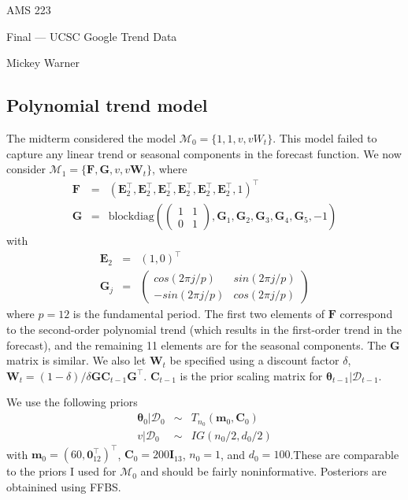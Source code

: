 \documentclass[12pt]{article}
\newcommand{\m}[1]{\mathbf{\bm{#1}}}
\begin{document}
\noindent AMS 223

\noindent Final --- UCSC Google Trend Data

\noindent Mickey Warner

\subsection*{Polynomial trend model}

\noindent The midterm considered the model $\mathcal{M}_0=\{1,1,v,vW_t\}$. This model failed to capture any linear trend or seasonal components in the forecast function. We now consider $\mathcal{M}_1=\{\m{F}, \m{G}, v, v\m{W}_t\}$, where
\begin{eqnarray*}
\m{F} &=& (\m{E}_2^\top, \m{E}_2^\top, \m{E}_2^\top, \m{E}_2^\top, \m{E}_2^\top, \m{E}_2^\top, 1)^\top \\
\m{G} &=& \mathrm{blockdiag}\left(\left(\begin{array}{cc} 1 & 1 \\ 0 & 1 \end{array} \right), \m{G}_1, \m{G}_2, \m{G}_3, \m{G}_4, \m{G}_5, -1 \right)
\end{eqnarray*}
\noindent with
\begin{eqnarray*}
\m{E}_2 &=& (1, 0)^\top \\
\m{G}_j &=& \left(\begin{array}{cc} cos(2\pi j/p) & sin(2\pi j/p) \\ -sin(2\pi j/p) & cos(2\pi j/p) \end{array}\right)
\end{eqnarray*}
\noindent where $p=12$ is the fundamental period. The first two elements of $\m{F}$ correspond to the second-order polynomial trend (which results in the first-order trend in the forecast), and the remaining 11 elements are for the seasonal components. The $\m{G}$ matrix is similar. We also let $\m{W}_t$ be specified using a discount factor $\delta$, $\m{W}_t=(1-\delta)/\delta\m{G}\m{C}_{t-1}\m{G}^\top$. $\m{C}_{t-1}$ is the prior scaling matrix for $\m{\theta}_{t-1}|\mathcal{D}_{t-1}$.
\bigskip

\noindent We use the following priors
\begin{eqnarray*}
\m{\theta}_0|\mathcal{D}_0 &\sim& T_{n_0}(\m{m}_0, \m{C}_0) \\
v|\mathcal{D}_0 &\sim& IG(n_0/2,d_0/2)
\end{eqnarray*}
\noindent with $\m{m}_0=(60, \m{0}_{12}^\top)^\top$, $\m{C}_0=200\m{I}_{13}$, $n_0=1$, and $d_0=100$.These are comparable to the priors I used for $\mathcal{M}_0$ and should be fairly noninformative. Posteriors are obtainined using FFBS.
\end{document}
